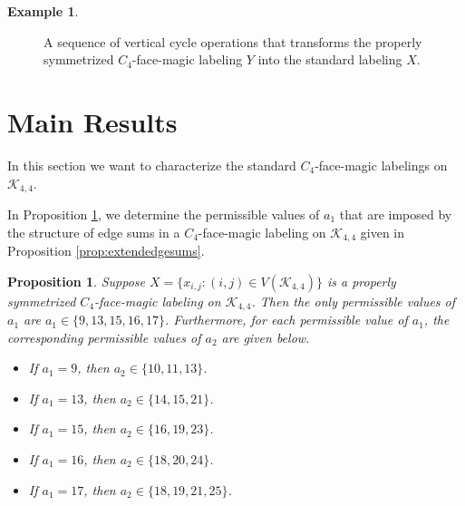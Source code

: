 \documentclass[10pt, reqno]{amsart}
\theoremstyle{definition}
\newtheorem{example}[definition]{Example}
\theoremstyle{plain}
\newtheorem{proposition}[definition]{Proposition}
\begin{document}
\begin{example}
\begin{figure}[hbt!]

\caption{A sequence of vertical cycle operations that transforms 
the properly symmetrized $C_4$-face-magic labeling $Y$ into the
standard labeling $X$.}
\label{fig:standardlabeling}
\end{figure}


\end{example}


\section{Main Results}

In this section we want to characterize the standard 
$C_4$-face-magic labelings on $\mathcal{K}_{4,4}$.


In Proposition \ref{prop:PermissibleA1Values}, we
determine the permissible values of $a_1$ that
are imposed by the structure of edge sums in a $C_4$-face-magic labeling on $\mathcal{K}_{4,4}$ given in
Proposition \ref{prop:extendedgesums}.

\begin{proposition} \label{prop:PermissibleA1Values}
     Suppose $X=\{ x_{i,j} : (i,j) \in V(\mathcal{K}_{4,4})\}$ 
  is a properly symmetrized $C_4$-face-magic labeling on $\mathcal{K}_{4,4}$.
  Then the only permissible values of $a_1$ 
  are $a_1\in\{9,13,15,16,17\}$.
  Furthermore, for each permissible value of $a_1$,
  the corresponding permissible values of $a_2$ are given below.
  \begin{itemize}
    \item If $a_1=9$, then $a_2\in\{10,11,13\}$.
    \item If $a_1=13$, then $a_2\in\{14,15,21\}$.
    \item If $a_1=15$, then $a_2\in\{16,19,23\}$.
    \item If $a_1=16$, then $a_2\in\{18,20,24\}$.
    \item If $a_1=17$, then $a_2\in\{18,19,21,25\}$.
  \end{itemize}
\end{proposition}
\end{document}
